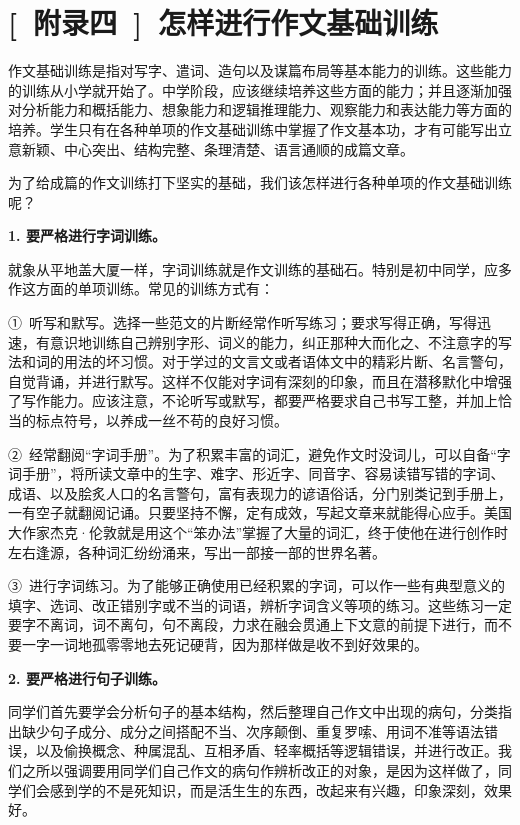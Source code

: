\section{[\ 附录四\ ]\ 怎样进行作文基础训练}

作文基础训练是指对写字、遣词、造句以及谋篇布局等基本能力的训练。这些能力的训练从小学就开始了。中学阶段，应该继续培养这些方面的能力；并且逐渐加强对分析能力和概括能力、想象能力和逻辑推理能力、观察能力和表达能力等方面的培养。学生只有在各种单项的作文基础训练中掌握了作文基本功，才有可能写出立意新颖、中心突出、结构完整、条理清楚、语言通顺的成篇文章。

为了给成篇的作文训练打下坚实的基础，我们该怎样进行各种单项的作文基础训练呢？

\textbf{1. 要严格进行字词训练。}

就象从平地盖大厦一样，字词训练就是作文训练的基础石。特别是初中同学，应多作这方面的单项训练。常见的训练方式有：

①\ 听写和默写。选择一些范文的片断经常作听写练习；要求写得正确，写得迅速，有意识地训练自己辨别字形、词义的能力，纠正那种大而化之、不注意字的写法和词的用法的坏习惯。对于学过的文言文或者语体文中的精彩片断、名言警句，自觉背诵，并进行默写。这样不仅能对字词有深刻的印象，而且在潜移默化中增强了写作能力。应该注意，不论听写或默写，都要严格要求自己书写工整，并加上恰当的标点符号，以养成一丝不苟的良好习惯。

②\ 经常翻阅“字词手册”。为了积累丰富的词汇，避免作文时没词儿，可以自备“字词手册”，将所读文章中的生字、难字、形近字、同音字、容易读错写错的字词、成语、以及脍炙人口的名言警句，富有表现力的谚语俗话，分门别类记到手册上，一有空子就翻阅记诵。只要坚持不懈，定有成效，写起文章来就能得心应手。美国大作家杰克·伦敦就是用这个“笨办法”掌握了大量的词汇，终于使他在进行创作时左右逢源，各种词汇纷纷涌来，写出一部接一部的世界名著。

③\ 进行字词练习。为了能够正确使用已经积累的字词，可以作一些有典型意义的填字、选词、改正错别字或不当的词语，辨析字词含义等项的练习。这些练习一定要字不离词，词不离句，句不离段，力求在融会贯通上下文意的前提下进行，而不要一字一词地孤零零地去死记硬背，因为那样做是收不到好效果的。

\textbf{2. 要严格进行句子训练。}

同学们首先要学会分析句子的基本结构，然后整理自己作文中出现的病句，分类指出缺少句子成分、成分之间搭配不当、次序颠倒、重复罗嗦、用词不准等语法错误，以及偷换概念、种属混乱、互相矛盾、轻率概括等逻辑错误，并进行改正。我们之所以强调要用同学们自己作文的病句作辨析改正的对象，是因为这样做了，同学们会感到学的不是死知识，而是活生生的东西，改起来有兴趣，印象深刻，效果好。

